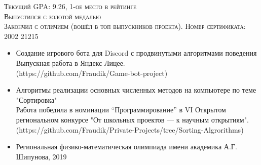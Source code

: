 \documentclass[10pt,a4paper]{altacv}
\begin{document}
\tagline{}

\begin{fullwidth}
\makecvheader
\end{fullwidth}


\textsc{Текущий GPA: 9.26, 1-ое место в рейтинге}
\\
\vspace{10pt}
\textsc{Выпустился с золотой медалью}
\\
\vspace{10pt}
\textsc{Закончил с отличием (вошёл в топ выпускников проекта). Номер сертификата: 2002 21215}
\\
\vspace{10pt}
\textsc{}


\begin{itemize}
\item Создание игрового бота для Discord с продвинутыми алгоритмами поведения \\
Выпускная работа в Яндекс Лицее. \\
(https://github.com/Fraudik/Game-bot-project)
\item Алгоритмы реализации основных численных методов на компьютере по теме "Сортировка" \\ Работа победила в номинации “Программирование” в VI Открытом региональном конкурсе "От школьных проектов --- к научным открытиям". \\
(https://github.com/Fraudik/Private-Projects/tree/Sorting-Algrorithms)
\end{itemize}

\begin{itemize}
\item Региональная физико-математическая олимпиада имени академика А.Г. Шипунова, 2019
\end{itemize}

\clearpage
\end{document}
